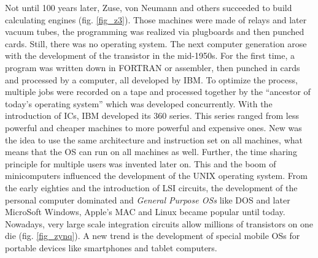 Not until 100 years later, Zuse, von Neumann and others succeeded to build calculating engines (fig. \ref{fig_z3}). 
Those machines were made of relays and later vacuum tubes, the programming was realized via plugboards and then punched cards.
Still, there was no operating system.
The next computer generation arose with the development of the transistor in the mid-1950s.
For the first time, a program was written down in FORTRAN or assembler, then punched in cards and processed by a computer, all developed by IBM. 
To optimize the process, multiple jobs were recorded on a tape and processed together by the ``ancestor of today's operating system'' \cite{tanenbaum:mos} which was developed concurrently.
With the introduction of \acp{IC}, IBM developed its 360 series.
This series ranged from less powerful and cheaper machines to more powerful and expensive ones.
New was the idea to use the same architecture and instruction set on all machines, what means that the \ac{OS} can run on all machines as well.
Further, the time sharing principle for multiple users was invented later on.
This and the boom of minicomputers influenced the development of the UNIX operating system.
From the early eighties and the introduction of \ac{LSI} circuits, the development of the personal computer dominated and \textit{General Purpose \acp{OS}} like \ac{DOS} and later MicroSoft Windows, Apple's \ac{MAC} and Linux became popular until today. 
Nowadays, very large scale integration circuits allow millions of transistors on one die (fig. \ref{fig_zynq}). 
A new trend is the development of special mobile \acp{OS} for portable devices like smartphones and tablet computers. 

